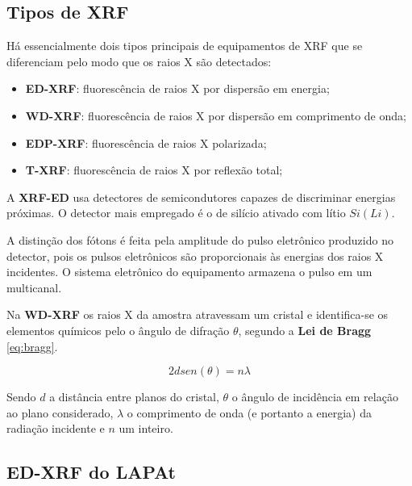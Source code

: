 \subsection{Tipos de XRF}

Há essencialmente dois tipos principais de equipamentos de XRF que se 
diferenciam pelo modo que os raios X são detectados:

\begin{itemize}
  \item \textbf{ED-XRF}: fluorescência de raios X por dispersão em energia;
  \item \textbf{WD-XRF}: fluorescência de raios X por dispersão em comprimento de onda;
  \item \textbf{EDP-XRF}: fluorescência de raios X polarizada;
  \item \textbf{T-XRF}: fluorescência de raios X por reflexão total;
\end{itemize}


A \textbf{XRF-ED} usa detectores de semicondutores capazes de
discriminar energias próximas. 
O detector mais empregado é o de silício ativado com lítio $Si(Li)$. 

A distinção dos fótons é feita pela amplitude do pulso 
eletrônico produzido no detector, pois os pulsos eletrônicos são
proporcionais às energias dos raios X incidentes. O sistema eletrônico do 
equipamento armazena o pulso em um multicanal.


Na \textbf{WD-XRF} os raios X da amostra atravessam um cristal 
e identifica-se os elementos químicos pelo o ângulo de difração $\theta$, segundo 
a \textbf{Lei de Bragg} \ref{eq:bragg}. 

\begin{equation}
  \label{eq:bragg}
  2d sen(\theta) = n \lambda
\end{equation}

Sendo $d$ a distância entre planos do cristal, $\theta$ o ângulo de incidência em 
relação ao plano considerado, $\lambda$ o comprimento de onda (e portanto a energia) 
da radiação incidente e $n$ um inteiro. 

\subsection{\textbf{ED-XRF} do \textbf{LAPAt}}

